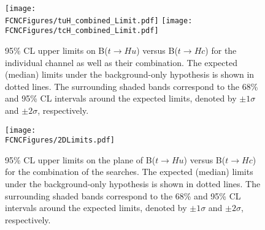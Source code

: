 \begin{figure}[htb]
\centering
\texttt{[image: \\FCNCFigures/tuH\_combined\_Limit.pdf]}
\texttt{[image: \\FCNCFigures/tcH\_combined\_Limit.pdf]}
\caption{95\% CL upper limits on B($t\rightarrow Hu$) versus B($t\rightarrow Hc$) for the individual channel as well as their combination. %
The expected (median) limits under the background-only hypothesis is shown in dotted lines. The surrounding shaded bands correspond to the 68\% and 95\% CL
intervals around the expected limits, denoted by $\pm1\sigma$ and $\pm2\sigma$, respectively. }
\label{fig:combined_limit}
\end{figure}


\begin{figure}[htb]
\centering
\texttt{[image: \\FCNCFigures/2DLimits.pdf]}
\caption{95\% CL upper limits on the plane of B($t\rightarrow Hu$) versus B($t\rightarrow Hc$) for the combination of the searches. The expected
(median) limits under the background-only hypothesis is shown in dotted lines. The surrounding shaded bands correspond to
the 68\% and 95\% CL intervals around the expected limits, denoted by $\pm1\sigma$ and $\pm2\sigma$, respectively.}
\label{fig:combined_2D_limit}
\end{figure}